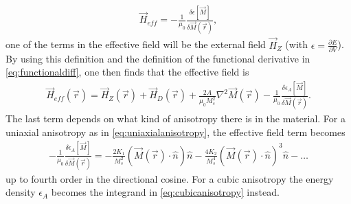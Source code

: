 \documentclass[12pt, a4paper]{article}		%
\numberwithin{equation}{section}
\begin{document}
\begin{align}
\vec{H}_{eff} = -\frac{1}{\mu_0}\frac{\delta \epsilon[\vec{M}]}{\delta \vec{M}(\vec{r})},
\end{align}
one of the terms in the effective field will be the external field $\vec{H}_Z$ (with $\epsilon = \frac{\partial E}{\partial V}$). By using this definition and the definition of the functional derivative in \eqref{eq:functionaldiff}, one then finds that the effective field is
\begin{align}
\label{eq:effectivefield}
\vec{H}_{eff}(\vec{r}) = \vec{H}_Z(\vec{r}) + \vec{H}_D(\vec{r}) + \frac{2A}{\mu_0M_s^2}\nabla^2\vec{M}(\vec{r}) -\frac{1}{\mu_0}\frac{\delta \epsilon_A[\vec{M}]}{\delta \vec{M}(\vec{r})}.
\end{align}
The last term depends on what kind of anisotropy there is in the material. For a uniaxial anisotropy as in \eqref{eq:uniaxialanisotropy}, the effective field term becomes 
\begin{align}
\label{eq:effielduniaxialani}
-\frac{1}{\mu_0}\frac{\delta \epsilon_A[\vec{M}]}{\delta \vec{M}(\vec{r})} = -\frac{2K_1}{M_s^2}(\vec{M}(\vec{r})\cdot\hat{n})\hat{n} - \frac{4K_2}{M_s^4}(\vec{M}(\vec{r})\cdot\hat{n})^3\hat{n} - \ldots
\end{align}
up to fourth order in the directional cosine. For a cubic anisotropy the energy density $\epsilon_A$ becomes the integrand in \eqref{eq:cubicanisotropy} instead.
\end{document}
